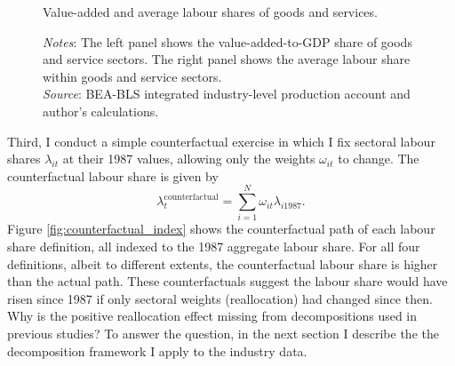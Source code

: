 \begin{figure}[h]
  \centering
    \caption{\normalsize Value-added and average labour shares of goods and services.}
  \vfill

    \label{fig:GS}

\begin{minipage}{\linewidth}
    \caption*{\textit{Notes}: The left panel shows the value-added-to-GDP share of goods and service sectors. The right panel shows the average labour share within goods and service sectors. \\
    \textit{Source}: BEA-BLS integrated industry-level production account and author's calculations.}
\end{minipage}
\end{figure}


Third, I conduct a simple counterfactual exercise in which I fix sectoral labour shares $\lambda_{it}$ at their 1987 values, allowing only the weights $\omega_{it}$ to change. The counterfactual labour share is given by
\begin{equation}
    \lambda_{t}^{\text{counterfactual}} = \sum_{i=1}^{N}\omega_{it}\lambda_{i1987}.
\label{eqn:counterfactual_ls}
\end{equation}
Figure \ref{fig:counterfactual_index} shows the counterfactual path of each labour share definition, all indexed to the 1987 aggregate labour share. For all four definitions, albeit to different extents, the counterfactual labour share is higher than the actual path. These counterfactuals suggest the labour share would have risen since 1987 if only sectoral weights (reallocation) had changed since then. Why is the positive reallocation effect missing from decompositions used in previous studies? To answer the question, in the next section I describe the the decomposition framework I apply to the industry data. 



